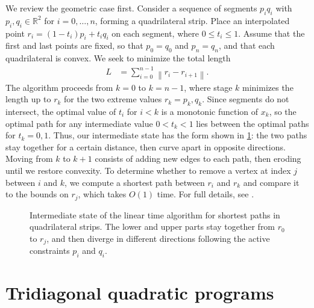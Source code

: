 \documentclass[11pt]{article}
\newcommand{\R}{\mathbb{R}}
\begin{document}
We review the geometric case first.  Consider a sequence of segments $p_i q_i$ with $p_i, q_i \in \R^2$ for $i = 0, \ldots, n$, forming a quadrilateral strip.  Place an interpolated point
$r_i = (1-t_i) p_i + t_i q_i$ on each segment, where $0 \le t_i \le 1$.  Assume that the first and last points are fixed, so that $p_0 = q_0$ and $p_n = q_n$, and that each quadrilateral is convex.
We seek to minimize the total length
\begin{align*}
L &= \sum_{i=0}^{n-1} \left\| r_i - r_{i+1} \right\|.
\end{align*}
The algorithm proceeds from $k = 0$ to $k = n-1$, where stage $k$ minimizes the length up to $r_k$ for the two extreme values $r_k = p_k, q_k$.  Since segments do not intersect, the optimal value
of $t_i$ for $i < k$ is a monotonic function of $x_k$, so the optimal path for any intermediate value $0 < t_k < 1$ lies between the optimal paths for $t_k = 0,1$.  Thus, our intermediate state has the form shown in
\cref{kite}: the two paths stay together for a certain distance, then curve apart in opposite directions.  Moving from $k$ to $k+1$ consists of adding new edges to each path, then eroding until
we restore convexity.  To determine whether to remove a vertex at index $j$ between $i$ and $k$, we compute a shortest path between $r_i$ and $r_k$ and compare it to the bounds on $r_j$, which takes $O(1)$ time.
For full details, see \cite{lee1984euclidean}.

\begin{figure}
\begin{center}
\end{center}
\caption{Intermediate state of the linear time algorithm for shortest paths in quadrilateral strips.  The lower and upper parts stay together from $r_0$ to $r_j$, and then diverge in different directions
following the active constraints $p_i$ and $q_i$. \label{kite}}
\end{figure}

\section{Tridiagonal quadratic programs}
\end{document}
